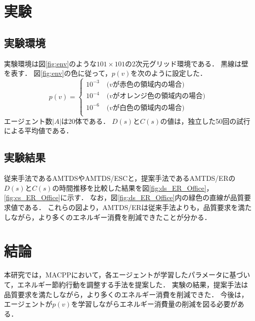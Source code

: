 \documentclass[11pt,a4j,twocolumn]{jarticle}
\begin{document}
\section{実験}
\subsection{実験環境}
  実験環境は図\ref{fig:env}のような$101 \times 101$の2次元グリッド環境である．
  黒線は壁を表す．
  図\ref{fig:env}の色に従って，$p(v)$を次のように設定した．
  \[
    p(v) = 
    \begin{cases}
      10^{-3}\ & \textrm{($v$が赤色の領域内の場合)}\\
      10^{-4}\ & \textrm{($v$がオレンジ色の領域内の場合)}\\
      10^{-6}\ & \textrm{($v$が白色の領域内の場合)}\\
    \end{cases}
  \]
  エージェント数$|A|$は20体である．
  $D(s)$と$C(s)$の値は，独立した50回の試行による平均値である．

  \subsection{実験結果}
  従来手法であるAMTDSやAMTDS/ESCと，提案手法であるAMTDS/ERの$D(s)$と$C(s)$の時間推移を比較した結果を図\ref{fig:ds_ER_Office}，\ref{fig:cs_ER_Office}に示す．
  なお，図\ref{fig:ds_ER_Office}内の緑色の直線が品質要求値である．
  これらの図より，AMTDS/ERは従来手法よりも，品質要求を満たしながら，より多くのエネルギー消費を削減できたことが分かる．

\section{結論}
本研究では，MACPPにおいて，各エージェントが学習したパラメータに基づいて，エネルギー節約行動を調整する手法を提案した．
実験の結果，提案手法は品質要求を満たしながら，より多くのエネルギー消費を削減できた．
今後は，エージェントが$p(v)$を学習しながらエネルギー消費量の削減を図る必要がある．



\end{document}
